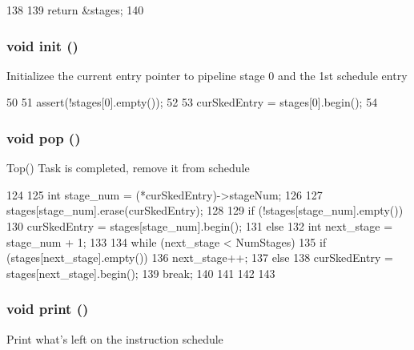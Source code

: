\begin{DoxyCode}
138     {
139         return &stages;
140     }
\end{DoxyCode}
\hypertarget{classResourceSked_a02fd73d861ef2e4aabb38c0c9ff82947}{
\subsubsection[{init}]{\setlength{\rightskip}{0pt plus 5cm}void init ()}}
\label{classResourceSked_a02fd73d861ef2e4aabb38c0c9ff82947}
Initializee the current entry pointer to pipeline stage 0 and the 1st schedule entry 


\begin{DoxyCode}
50 {
51     assert(!stages[0].empty());
52 
53     curSkedEntry = stages[0].begin();
54 }
\end{DoxyCode}
\hypertarget{classResourceSked_a312e7f6c761a199c1369fbe651e084f0}{
\subsubsection[{pop}]{\setlength{\rightskip}{0pt plus 5cm}void pop ()}}
\label{classResourceSked_a312e7f6c761a199c1369fbe651e084f0}
Top() Task is completed, remove it from schedule 


\begin{DoxyCode}
124 {
125     int stage_num = (*curSkedEntry)->stageNum;
126 
127     stages[stage_num].erase(curSkedEntry);
128 
129     if (!stages[stage_num].empty()) {
130         curSkedEntry = stages[stage_num].begin();
131     } else {
132         int next_stage = stage_num + 1;
133 
134         while (next_stage < NumStages) {
135             if (stages[next_stage].empty()) {
136                 next_stage++;
137             } else {
138                 curSkedEntry = stages[next_stage].begin();
139                 break;
140             }
141         }
142     }
143 }
\end{DoxyCode}
\hypertarget{classResourceSked_a388f572c62279f839ee138a9afbdeeb5}{
\subsubsection[{print}]{\setlength{\rightskip}{0pt plus 5cm}void print ()}}
\label{classResourceSked_a388f572c62279f839ee138a9afbdeeb5}
Print what's left on the instruction schedule 


